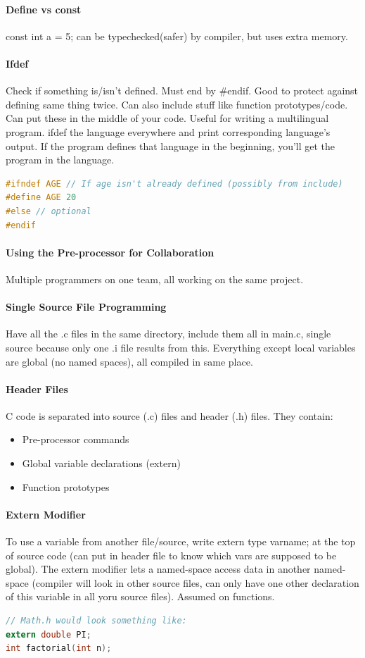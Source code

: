 \documentclass[12 pt]{article}
\begin{document}
\paragraph{Define vs const} const int a = 5; can be typechecked(safer) by compiler, but uses extra memory.
\paragraph{Ifdef} Check if something is/isn't defined. Must end by \#endif. Good to protect against defining same thing twice. Can also include stuff like function prototypes/code. Can put these in the middle of your code. Useful for writing a multilingual program. ifdef the language everywhere and print corresponding language's output. If the program defines that language in the beginning, you'll get the program in the language.
\begin{lstlisting}[language=c]
#ifndef AGE // If age isn't already defined (possibly from include)
#define AGE 20
#else // optional
#endif
\end{lstlisting}
\paragraph{Using the Pre-processor for Collaboration} Multiple programmers on one team, all working on the same project.
\paragraph{Single Source File Programming} Have all the .c files in the same directory, include them all in main.c, single source because only one .i file results from this. Everything except local variables are global (no named spaces), all compiled in same place.
\paragraph{Header Files}C code is separated into source (.c) files and header (.h) files. They contain:
\begin{itemize}
\item Pre-processor commands
\item Global variable declarations (extern)
\item Function prototypes
\end{itemize}
\paragraph{Extern Modifier} To use a variable from another file/source, write extern type varname; at the top of source code (can put in header file to know which vars are supposed to be global). The extern modifier lets a named-space access data in another named-space (compiler will look in other source files, can only have one other declaration of this variable in all yoru source files). Assumed on functions.
\begin{lstlisting}[language=c]
// Math.h would look something like:
extern double PI;
int factorial(int n);
\end{lstlisting}
\end{document}
